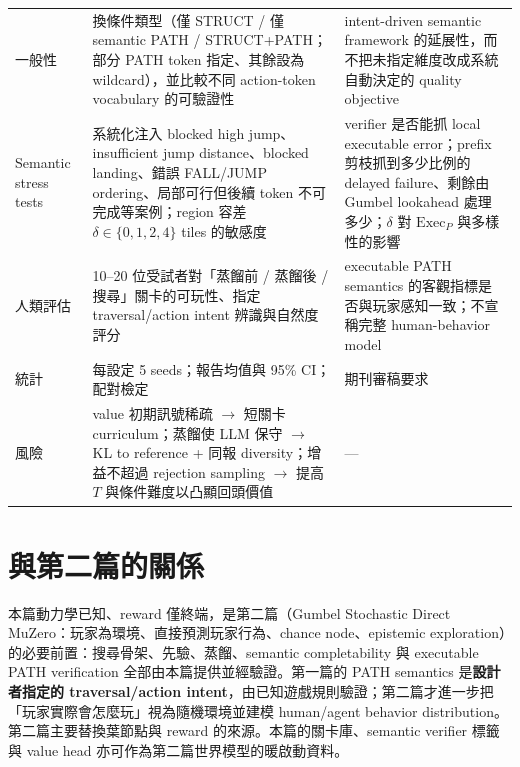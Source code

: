 \documentclass[11pt,a4paper]{article}
\begin{document}
\begin{table}[H]
\begin{tabularx}{\textwidth}{>{\raggedright\arraybackslash}p{2.3cm}XX}
一般性 & 換條件類型（僅 STRUCT / 僅 semantic PATH / STRUCT+PATH；部分 PATH token 指定、其餘設為 wildcard），並比較不同 action-token vocabulary 的可驗證性 & intent-driven semantic framework 的延展性，而不把未指定維度改成系統自動決定的 quality objective \\
Semantic stress tests & 系統化注入 blocked high jump、insufficient jump distance、blocked landing、錯誤 FALL/JUMP ordering、局部可行但後續 token 不可完成等案例；region 容差 $\delta\in\{0,1,2,4\}$ tiles 的敏感度 & verifier 是否能抓 local executable error；prefix 剪枝抓到多少比例的 delayed failure、剩餘由 Gumbel lookahead 處理多少；$\delta$ 對 $\mathrm{Exec}_P$ 與多樣性的影響 \\
人類評估 & 10–20 位受試者對「蒸餾前 / 蒸餾後 / 搜尋」關卡的可玩性、指定 traversal/action intent 辨識與自然度評分 & executable PATH semantics 的客觀指標是否與玩家感知一致；不宣稱完整 human-behavior model \\
統計 & 每設定 5 seeds；報告均值與 95\% CI；配對檢定 & 期刊審稿要求 \\
風險 & value 初期訊號稀疏 $\to$ 短關卡 curriculum；蒸餾使 LLM 保守 $\to$ KL to reference + 同報 diversity；增益不超過 rejection sampling $\to$ 提高 $T$ 與條件難度以凸顯回頭價值 & — \\
\bottomrule
\end{tabularx}
\end{table}

\section{與第二篇的關係}
本篇動力學已知、reward 僅終端，是第二篇（Gumbel Stochastic Direct MuZero：玩家為環境、直接預測玩家行為、chance node、epistemic exploration）的必要前置：搜尋骨架、先驗、蒸餾、semantic completability 與 executable PATH verification 全部由本篇提供並經驗證。第一篇的 PATH semantics 是\textbf{設計者指定的 traversal/action intent}，由已知遊戲規則驗證；第二篇才進一步把「玩家實際會怎麼玩」視為隨機環境並建模 human/agent behavior distribution。第二篇主要替換葉節點與 reward 的來源。本篇的關卡庫、semantic verifier 標籤與 value head 亦可作為第二篇世界模型的暖啟動資料。

\end{document}
